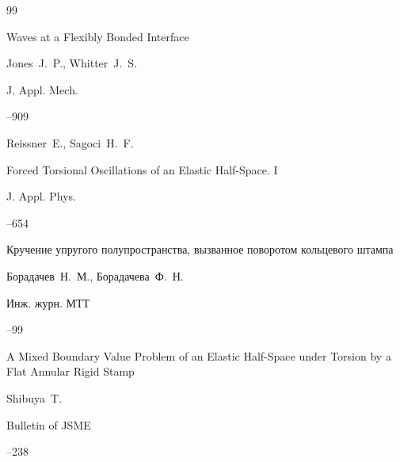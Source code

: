 \begin{thebibliography}{99}








\paper Waves at a Flexibly Bonded Interface

\by Jones~J.~P., Whitter~J.~S.

\jour  J. Appl. Mech.




--909 





\by Reissner~E., Sagoci~H.~F.

\paper Forced Torsional Oscillations of an Elastic Half-Space. I

\jour J. Appl. Phys.




--654






\paper Кручение упругого полупространства, вызванное поворотом кольцевого штампа 

\by Борадачев~Н.~М., Борадачева~Ф.~Н. 

\jour Инж. журн. МТТ 



--99




\paper A Mixed Boundary Value Problem of an Elastic Half-Space under Torsion by a Flat Annular Rigid Stamp

\by Shibuya~T. 

\jour Bulletin of JSME




--238


\end{thebibliography}
